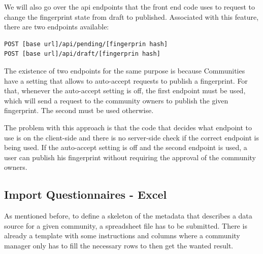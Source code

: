 We will also go over the \gls{api} endpoints that the front end code uses to request to change the fingerprint state from draft to published.
Associated with this feature, there are two endpoints available:

\begin{verbatim}
POST [base url]/api/pending/[fingerprin hash]
POST [base url]/api/draft/[fingerprin hash]
\end{verbatim}

The existence of two endpoints for the same purpose is because Communities have a setting that allows to auto-accept requests to publish a fingerprint.
For that, whenever the auto-accept setting is off, the first endpoint must be used, which will send a request to the community owners to publish the given fingerprint.
The second must be used otherwise.

The problem with this approach is that the code that decides what endpoint to use is on the client-side and there is no server-side check if the correct endpoint is being used.
If the auto-accept setting is off and the second endpoint is used, a user can publish his fingerprint without requiring the approval of the community owners.

\subsection{Import Questionnaires - Excel}
\label{subsection:excel}

As mentioned before, to define a skeleton of the metadata that describes a data source for a given community, a spreadsheet file has to be submitted.
There is already a template with some instructions and columns where a community manager only has to fill the necessary rows to then get the wanted result.

